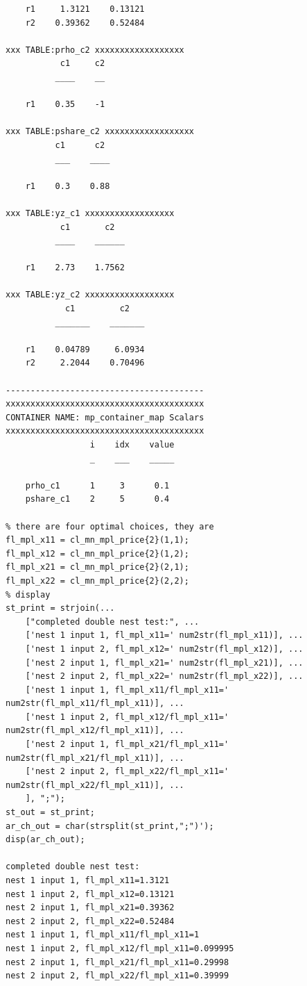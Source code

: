 \documentclass[
]{book}
\begin{document}
\begin{verbatim}
    r1     1.3121    0.13121
    r2    0.39362    0.52484

xxx TABLE:prho_c2 xxxxxxxxxxxxxxxxxx
           c1     c2
          ____    __

    r1    0.35    -1

xxx TABLE:pshare_c2 xxxxxxxxxxxxxxxxxx
          c1      c2 
          ___    ____

    r1    0.3    0.88

xxx TABLE:yz_c1 xxxxxxxxxxxxxxxxxx
           c1       c2  
          ____    ______

    r1    2.73    1.7562

xxx TABLE:yz_c2 xxxxxxxxxxxxxxxxxx
            c1         c2   
          _______    _______

    r1    0.04789     6.0934
    r2     2.2044    0.70496

----------------------------------------
xxxxxxxxxxxxxxxxxxxxxxxxxxxxxxxxxxxxxxxx
CONTAINER NAME: mp_container_map Scalars
xxxxxxxxxxxxxxxxxxxxxxxxxxxxxxxxxxxxxxxx
                 i    idx    value
                 _    ___    _____

    prho_c1      1     3      0.1 
    pshare_c1    2     5      0.4 

% there are four optimal choices, they are
fl_mpl_x11 = cl_mn_mpl_price{2}(1,1);
fl_mpl_x12 = cl_mn_mpl_price{2}(1,2);
fl_mpl_x21 = cl_mn_mpl_price{2}(2,1);
fl_mpl_x22 = cl_mn_mpl_price{2}(2,2);
% display
st_print = strjoin(...
    ["completed double nest test:", ...
    ['nest 1 input 1, fl_mpl_x11=' num2str(fl_mpl_x11)], ...
    ['nest 1 input 2, fl_mpl_x12=' num2str(fl_mpl_x12)], ...
    ['nest 2 input 1, fl_mpl_x21=' num2str(fl_mpl_x21)], ...
    ['nest 2 input 2, fl_mpl_x22=' num2str(fl_mpl_x22)], ...
    ['nest 1 input 1, fl_mpl_x11/fl_mpl_x11=' num2str(fl_mpl_x11/fl_mpl_x11)], ...
    ['nest 1 input 2, fl_mpl_x12/fl_mpl_x11=' num2str(fl_mpl_x12/fl_mpl_x11)], ...
    ['nest 2 input 1, fl_mpl_x21/fl_mpl_x11=' num2str(fl_mpl_x21/fl_mpl_x11)], ...
    ['nest 2 input 2, fl_mpl_x22/fl_mpl_x11=' num2str(fl_mpl_x22/fl_mpl_x11)], ...    
    ], ";");
st_out = st_print;
ar_ch_out = char(strsplit(st_print,";")');
disp(ar_ch_out);

completed double nest test:                   
nest 1 input 1, fl_mpl_x11=1.3121             
nest 1 input 2, fl_mpl_x12=0.13121            
nest 2 input 1, fl_mpl_x21=0.39362            
nest 2 input 2, fl_mpl_x22=0.52484            
nest 1 input 1, fl_mpl_x11/fl_mpl_x11=1       
nest 1 input 2, fl_mpl_x12/fl_mpl_x11=0.099995
nest 2 input 1, fl_mpl_x21/fl_mpl_x11=0.29998 
nest 2 input 2, fl_mpl_x22/fl_mpl_x11=0.39999 
\end{verbatim}
\end{document}
